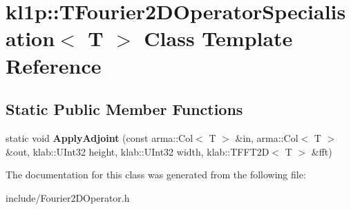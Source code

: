 \hypertarget{classkl1p_1_1TFourier2DOperatorSpecialisation}{}\section{kl1p\+:\+:T\+Fourier2\+D\+Operator\+Specialisation$<$ T $>$ Class Template Reference}
\label{classkl1p_1_1TFourier2DOperatorSpecialisation}
\subsection*{Static Public Member Functions}
\begin{DoxyCompactItemize}
\item 
static void {\bfseries Apply\+Adjoint} (const arma\+::\+Col$<$ T $>$ \&in, arma\+::\+Col$<$ T $>$ \&out, klab\+::\+U\+Int32 height, klab\+::\+U\+Int32 width, klab\+::\+T\+F\+F\+T2D$<$ T $>$ \&fft)\hypertarget{classkl1p_1_1TFourier2DOperatorSpecialisation_aa9b5fe7e102c0108addca9d306e7953f}{}\label{classkl1p_1_1TFourier2DOperatorSpecialisation_aa9b5fe7e102c0108addca9d306e7953f}

\end{DoxyCompactItemize}


The documentation for this class was generated from the following file\+:\begin{DoxyCompactItemize}
\item 
include/Fourier2\+D\+Operator.\+h\end{DoxyCompactItemize}
